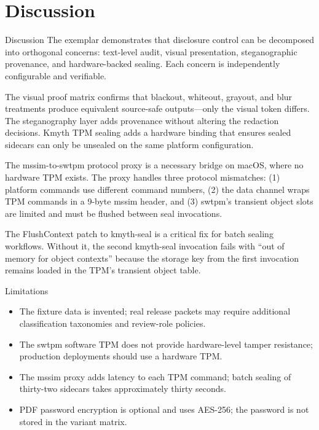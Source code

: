 \documentclass[
  ignorenonframetext,
]{beamer}
\providecommand{\tightlist}{%
  \setlength{\itemsep}{0pt}\setlength{\parskip}{0pt}}
\begin{document}
\section{Discussion}\label{discussion}

\begin{frame}[allowframebreaks]{Discussion}
The exemplar demonstrates that disclosure control can be decomposed into
orthogonal concerns: text-level audit, visual presentation,
steganographic provenance, and hardware-backed sealing. Each concern is
independently configurable and verifiable.

The visual proof matrix confirms that blackout, whiteout, grayout, and
blur treatments produce equivalent source-safe outputs---only the visual
token differs. The steganography layer adds provenance without altering
the redaction decisions. Kmyth TPM sealing adds a hardware binding that
ensures sealed sidecars can only be unsealed on the same platform
configuration.

The mssim-to-swtpm protocol proxy is a necessary bridge on macOS, where
no hardware TPM exists. The proxy handles three protocol mismatches: (1)
platform commands use different command numbers, (2) the data channel
wraps TPM commands in a 9-byte mssim header, and (3) swtpm's transient
object slots are limited and must be flushed between seal invocations.

The FlushContext patch to kmyth-seal is a critical fix for batch sealing
workflows. Without it, the second kmyth-seal invocation fails with ``out
of memory for object contexts'' because the storage key from the first
invocation remains loaded in the TPM's transient object table.
\end{frame}

\begin{frame}[allowframebreaks]{Limitations}
\protect{}\label{limitations}
\begin{itemize}
\tightlist
\item
  The fixture data is invented; real release packets may require
  additional classification taxonomies and review-role policies.
\item
  The swtpm software TPM does not provide hardware-level tamper
  resistance; production deployments should use a hardware TPM.
\item
  The mssim proxy adds latency to each TPM command; batch sealing of
  thirty-two sidecars takes approximately thirty seconds.
\item
  PDF password encryption is optional and uses AES-256; the password is
  not stored in the variant matrix.
\end{itemize}
\end{frame}
\end{document}
